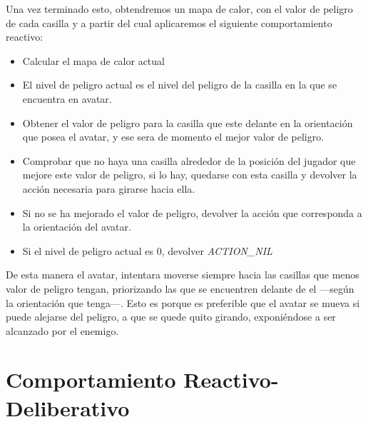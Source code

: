 Una vez terminado esto, obtendremos un mapa de calor, con el valor de peligro de cada casilla y a partir del cual aplicaremos el siguiente comportamiento reactivo:
\begin{itemize}
   \item Calcular el mapa de calor actual
   \item El nivel de peligro actual es el nivel del peligro de la casilla en la que se encuentra en avatar.
   \item Obtener el valor de peligro para la casilla que este delante en la orientación que posea el avatar, y ese sera de momento el mejor valor de peligro.
   \item Comprobar que no haya una casilla alrededor de la posición del jugador que mejore este valor de peligro, si lo hay, quedarse con esta casilla y devolver la acción necesaria para girarse hacia ella.
   \item Si no se ha mejorado el valor de peligro, devolver la acción que corresponda a la orientación del avatar.
   \item Si el nivel de peligro actual es 0, devolver \emph{ACTION\_NIL}
\end{itemize}

De esta manera el avatar, intentara moverse siempre hacia las casillas que menos valor de peligro tengan, priorizando las que se encuentren delante de el ---según la orientación que tenga---. Esto es porque es preferible que el avatar se mueva si puede alejarse del peligro, a que se quede quito girando, exponiéndose a ser alcanzado por el enemigo.

\newpage
\chapter{Comportamiento Reactivo-Deliberativo}

